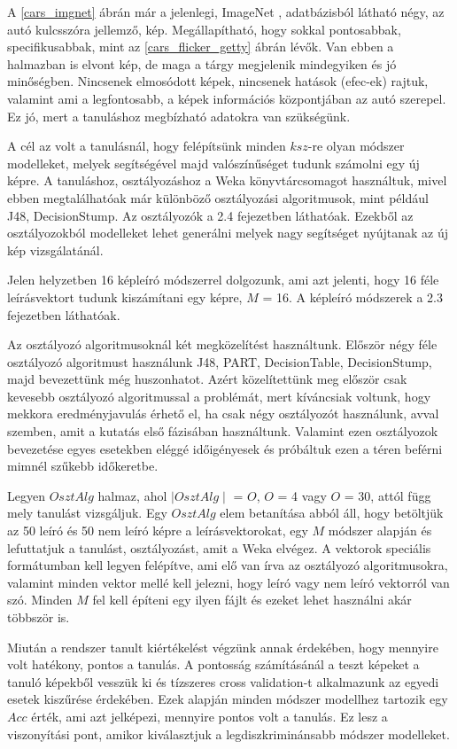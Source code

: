 \documentclass[12pt, a4paper, oneside]{book}
\theoremstyle{tetel}
\begin{document}
	A \ref{cars_imgnet} ábrán már a jelenlegi, ImageNet \cite{3}, adatbázisból látható négy, az autó kulcsszóra jellemző, kép. Megállapítható, hogy sokkal pontosabbak, specifikusabbak, mint az \ref{cars_flicker_getty} ábrán lévők. Van ebben a halmazban is elvont kép, de maga a tárgy megjelenik mindegyiken és jó minőségben. Nincsenek elmosódott képek, nincsenek hatások (efec-ek) rajtuk, valamint ami a legfontosabb, a képek információs központjában az autó szerepel. Ez jó, mert a tanuláshoz megbízható adatokra van szükségünk.

A cél az volt a tanulásnál, hogy felépítsünk minden $ksz$-re olyan módszer modelleket, melyek segítségével majd valószínűséget tudunk számolni egy új képre. A tanuláshoz, osztályozáshoz a Weka \cite{16} könyvtárcsomagot használtuk, mivel ebben megtalálhatóak már különböző osztályozási algoritmusok, mint például J48, DecisionStump. Az osztályozók a 2.4 fejezetben láthatóak. Ezekből az osztályozokból modelleket lehet generálni melyek nagy segítséget nyújtanak az új kép vizsgálatánál.
 
	Jelen helyzetben 16 képleíró módszerrel dolgozunk, ami azt jelenti, hogy 16 féle leírásvektort tudunk kiszámítani egy képre, $M$ = 16. A képleíró módszerek a 2.3 fejezetben láthatóak. 
	
	Az osztályozó algoritmusoknál két megközelítést használtunk. Először négy féle osztályozó algoritmust használunk J48, PART, DecisionTable, DecisionStump, majd bevezettünk még huszonhatot. Azért közelítettünk meg először csak kevesebb osztályozó algoritmussal a problémát, mert kíváncsiak voltunk, hogy mekkora eredményjavulás érhető el, ha csak négy osztályozót használunk, avval szemben, amit a kutatás első fázisában használtunk. Valamint ezen osztályozok bevezetése egyes esetekben eléggé időigényesek és próbáltuk ezen a téren beférni mimnél szűkebb időkeretbe. 

	Legyen $OsztAlg$ halmaz, ahol $\mid OsztAlg \mid$ = $O$, $O$ = 4 vagy $O$ = 30, attól függ mely tanulást vizsgáljuk. Egy $OsztAlg$ elem betanítása abból áll, hogy betöltjük az 50 leíró és 50 nem leíró képre a leírásvektorokat, egy $M$ módszer alapján és lefuttatjuk a tanulást, osztályozást, amit a Weka \cite{16} elvégez. A vektorok speciális formátumban kell legyen felépítve, ami elő van írva az osztályozó algoritmusokra, valamint minden vektor mellé kell jelezni, hogy leíró vagy nem leíró vektorról van szó. Minden $M$ fel kell építeni egy ilyen fájlt és ezeket lehet használni akár többször is.

	Miután a rendszer tanult kiértékelést végzünk annak érdekében, hogy mennyire volt hatékony, pontos a tanulás. A pontosság számításánál a teszt képeket a tanuló képekből vesszük ki és tízszeres cross validation-t \cite{17} alkalmazunk az egyedi esetek kiszűrése érdekében. Ezek alapján minden módszer modellhez tartozik egy $Acc$ érték, ami azt jelképezi, mennyire pontos volt a tanulás. Ez lesz a viszonyítási pont, amikor kiválasztjuk a legdiszkriminánsabb módszer modelleket.
\end{document}
